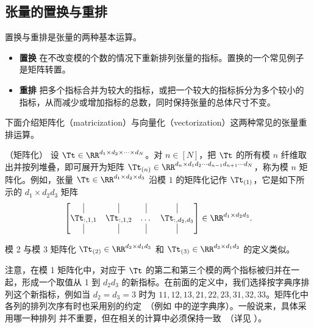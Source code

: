 \subsection{张量的置换与重排}
置换与重排是张量的两种基本运算。
\begin{itemize}
    \item \textbf{置换} 在不改变模的个数的情况下重新排列张量的指标。置换的一个常见例子是矩阵转置。
    \item  \textbf{重排} 把多个指标合并为较大的指标，或把一个较大的指标拆分为多个较小的指标，从而减少或增加指标的总数，同时保持张量的总体尺寸不变。
\end{itemize}
下面介绍矩阵化（matricization）与向量化（vectorization）这两种常见的张量重排运算。
\begin{definition}（矩阵化）\label{matricizitation:def}
设 $\Tt\in\RR^{d_1\times d_2\times \cdots\times d_N}$。对 $n\in[N]$，把 $\Tt$ 的所有模 $n$ 纤维取出并按列堆叠，即可展开为矩阵 $\Tt_{(n)}\in\RR^{d_n\times d_1d_2\cdots d_{n-1}d_{n+1}\cdots d_N}$，称为模 $n$ 矩阵化。例如，张量 $\Tt\in\RR^{d_1\times d_2\times d_3}$ 沿模 $1$ 的矩阵化记作 $\Tt_{(1)}$，它是如下所示的 $d_1\times d_2d_3$ 矩阵
$$
    \begin{bmatrix}
    \vline & \vline & \vline  & \vline \\
    \Tt_{:,1,1} & {\Tt}_{:,1,2}  & \dots  & {\Tt}_{:,d_2,d_3} \\
    \vline & \vline & \vline  & \vline 
    \end{bmatrix}
\in\RR^{d_1\times d_2d_3}.
$$

模 2 与模 3 矩阵化 $\Tt_{(2)}\in\RR^{d_2\times d_1d_3}$ 和 $\Tt_{(3)}\in\RR^{d_3\times d_1d_2}$ 的定义类似。
\end{definition}

注意，在模 1 矩阵化中，对应于 $\Tt$ 的第二和第三个模的两个指标被归并在一起，形成一个取值从 1 到 $d_2d_3$ 的新指标。在前面的定义中，我们选择按字典序排列这个新指标，例如当 $d_2=d_3=3$ 时为 $11,12,13,21,22,23,31,32,33$。矩阵化中各列的排列次序有时也采用别的约定~（例如 \citep{kolda2009tensor} 中的逆字典序）。一般说来，具体采用哪一种排列
并不重要，但在相关的计算中必须保持一致~（详见 \citep{kolda2006multilinear}）。



